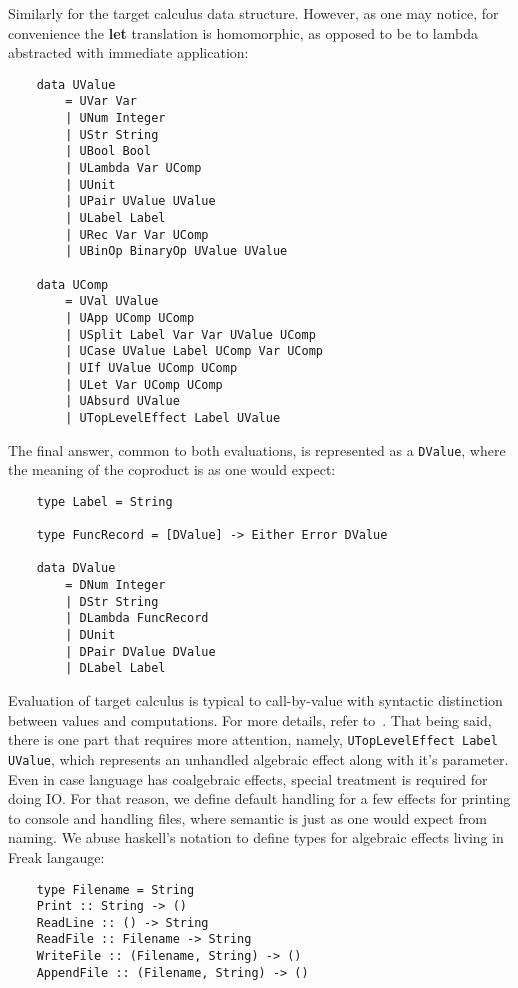 \documentclass[declaration,shortabstract]{iithesis}
\theoremstyle{definition} \newtheorem{definition}{Definition}[chapter]
\theoremstyle{remark} \newtheorem{remark}[definition]{Observation}
\theoremstyle{plain} \newtheorem{theorem}[definition]{Theorem}
\theoremstyle{plain} \newtheorem{lemma}[definition]{Lemma}
\begin{document}
    \noindent
    Similarly for the target calculus data structure. However, as one may notice,
    for convenience the \textbf{let} translation is homomorphic, as opposed to be
    to lambda abstracted with immediate application:

\begin{verbatim}
    data UValue
        = UVar Var
        | UNum Integer
        | UStr String
        | UBool Bool
        | ULambda Var UComp
        | UUnit
        | UPair UValue UValue
        | ULabel Label
        | URec Var Var UComp
        | UBinOp BinaryOp UValue UValue

    data UComp
        = UVal UValue
        | UApp UComp UComp
        | USplit Label Var Var UValue UComp
        | UCase UValue Label UComp Var UComp
        | UIf UValue UComp UComp
        | ULet Var UComp UComp
        | UAbsurd UValue
        | UTopLevelEffect Label UValue
\end{verbatim}

    \noindent
    The final answer, common to both evaluations, is represented as a \verb!DValue!,
    where the meaning of the coproduct is as one would expect:

\begin{verbatim}
    type Label = String

    type FuncRecord = [DValue] -> Either Error DValue

    data DValue
        = DNum Integer
        | DStr String
        | DLambda FuncRecord
        | DUnit
        | DPair DValue DValue
        | DLabel Label
\end{verbatim}

    \noindent
    Evaluation of target calculus is typical to call-by-value with syntactic
    distinction between values and computations. For more details, refer
    to~\cite{handlers-cps-journal}. That being said, there is one part
    that requires more attention, namely, \verb!UTopLevelEffect Label UValue!,
    which represents an unhandled algebraic effect along with it's parameter.
    Even in case language has coalgebraic effects, special treatment is required
    for doing IO\@. For that reason, we define default handling for a few effects
    for printing to console and handling files, where semantic is just as one
    would expect from naming. We abuse haskell's notation to define types for
    algebraic effects living in Freak langauge:

\begin{verbatim}
    type Filename = String
    Print :: String -> ()
    ReadLine :: () -> String
    ReadFile :: Filename -> String
    WriteFile :: (Filename, String) -> ()
    AppendFile :: (Filename, String) -> ()
\end{verbatim}
\end{document}
